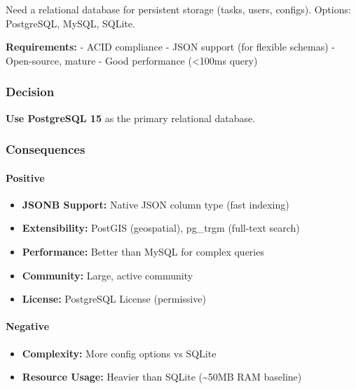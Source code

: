 \documentclass[
]{article}
\providecommand{\tightlist}{%
  \setlength{\itemsep}{0pt}\setlength{\parskip}{0pt}}
\begin{document}
Need a relational database for persistent storage (tasks, users,
configs). Options: PostgreSQL, MySQL, SQLite.

\textbf{Requirements:} - ACID compliance - JSON support (for flexible
schemas) - Open-source, mature - Good performance (\textless100ms query)

\hypertarget{decision-5}{%
\subsubsection{Decision}\label{decision-5}}

\textbf{Use PostgreSQL 15} as the primary relational database.

\hypertarget{consequences-5}{%
\subsubsection{Consequences}\label{consequences-5}}

\hypertarget{positive-5}{%
\paragraph{Positive}\label{positive-5}}

\begin{itemize}
\tightlist
\item
  \textbf{JSONB Support:} Native JSON column type (fast indexing)
\item
  \textbf{Extensibility:} PostGIS (geospatial), pg\_trgm (full-text
  search)
\item
  \textbf{Performance:} Better than MySQL for complex queries
\item
  \textbf{Community:} Large, active community
\item
  \textbf{License:} PostgreSQL License (permissive)
\end{itemize}

\hypertarget{negative-5}{%
\paragraph{Negative}\label{negative-5}}

\begin{itemize}
\tightlist
\item
  \textbf{Complexity:} More config options vs SQLite
\item
  \textbf{Resource Usage:} Heavier than SQLite (\textasciitilde50MB RAM
  baseline)
\end{itemize}
\end{document}
